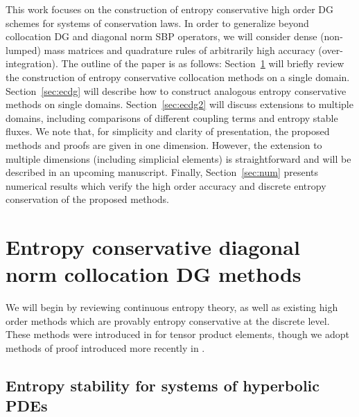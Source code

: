 \documentclass[preprint,10pt]{article}
\theoremstyle{definition}
\theoremstyle{lemma}
\theoremstyle{theorem}
\theoremstyle{assumption}
\newcommand{\note}[1]{{\color{blue}{#1}}}
\begin{document}
This work focuses on the construction of entropy conservative high order DG schemes for systems of conservation laws.  In order to generalize beyond collocation DG and diagonal norm SBP operators, we will consider dense (non-lumped) mass matrices and quadrature rules of arbitrarily high accuracy (over-integration).  The outline of the paper is as follows: Section~\ref{sec:intro} will briefly review the construction of entropy conservative collocation methods on a single domain.  Section~\ref{sec:ecdg} will describe how to construct analogous entropy conservative methods on single domains.  Section~\ref{sec:ecdg2} will discuss extensions to multiple domains, including comparisons of different coupling terms and entropy stable fluxes.  We note that, for simplicity and clarity of presentation, the proposed methods and proofs are given in one dimension.  However, the extension to multiple dimensions (including simplicial elements) is straightforward and will be described in an upcoming manuscript.  
Finally, Section~\ref{sec:num} presents numerical results which verify the high order accuracy and discrete entropy conservation of the proposed methods.  




\section{Entropy conservative diagonal norm collocation DG methods}
\label{sec:intro}

We will begin by reviewing continuous entropy theory, as well as existing high order methods which are provably entropy conservative at the discrete level.  These methods were introduced in \cite{fisher2013high, carpenter2014entropy} for tensor product elements, though we adopt methods of proof introduced more recently in \cite{gassner2017br1, chen2017entropy}.  


\subsection{Entropy stability for systems of hyperbolic PDEs}
\end{document}
